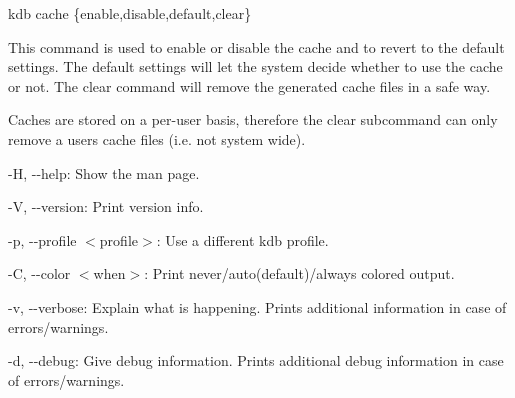 {\ttfamily kdb cache \{enable,disable,default,clear\}}

This command is used to enable or disable the cache and to revert to the default settings. The default settings will let the system decide whether to use the cache or not. The clear command will remove the generated cache files in a safe way.

Caches are stored on a per-\/user basis, therefore the {\ttfamily clear} subcommand can only remove a user\textquotesingle{}s cache files (i.\+e. not system wide).


\begin{DoxyItemize}
\item {\ttfamily -\/H}, {\ttfamily -\/-\/help}\+: Show the man page.
\item {\ttfamily -\/V}, {\ttfamily -\/-\/version}\+: Print version info.
\item {\ttfamily -\/p}, {\ttfamily -\/-\/profile $<$profile$>$}\+: Use a different kdb profile.
\item {\ttfamily -\/C}, {\ttfamily -\/-\/color $<$when$>$}\+: Print never/auto(default)/always colored output.
\item {\ttfamily -\/v}, {\ttfamily -\/-\/verbose}\+: Explain what is happening. Prints additional information in case of errors/warnings.
\item {\ttfamily -\/d}, {\ttfamily -\/-\/debug}\+: Give debug information. Prints additional debug information in case of errors/warnings.
\end{DoxyItemize}


\begin{DoxyCode}{0}
\DoxyCodeLine{}
\DoxyCodeLine{}
\DoxyCodeLine{}
\DoxyCodeLine{}
\end{DoxyCode}
 